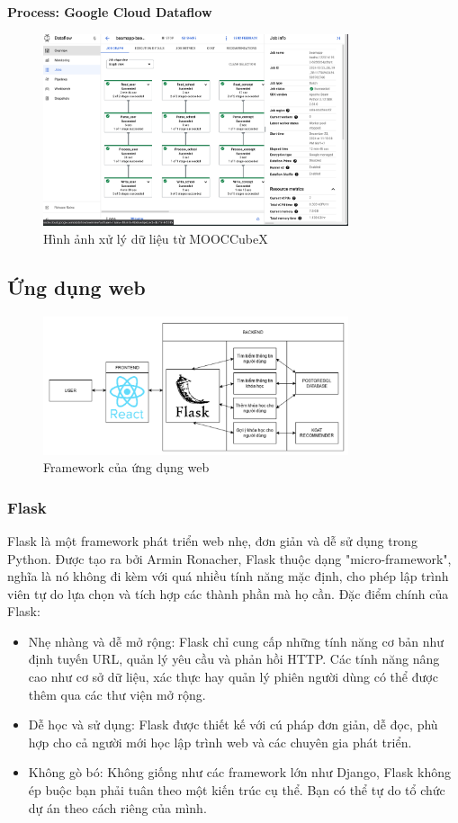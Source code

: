 \textbf{Process: Google Cloud Dataflow}
\begin{figure}[H]
    \centering
    \includegraphics[width=0.8\textwidth]{figures/74.png}
    \caption{Hình ảnh xử lý dữ liệu từ MOOCCubeX}
\end{figure}
\subsection{Ứng dụng web}
\begin{figure}[H]
    \centering
    \includegraphics[width=0.8\textwidth]{figures/79.png}
    \caption{Framework của ứng dụng web}
\end{figure}
\subsubsection{Flask}

Flask là một framework phát triển web nhẹ, đơn giản và dễ sử dụng trong Python.
Được tạo ra bởi Armin Ronacher, Flask thuộc dạng "micro-framework", nghĩa là nó
không đi kèm với quá nhiều tính năng mặc định, cho phép lập trình viên tự do lựa
chọn và tích hợp các thành phần mà họ cần. Đặc điểm chính của Flask:
\begin{itemize}
    \item Nhẹ nhàng và dễ mở rộng: Flask chỉ cung cấp những tính năng cơ bản như
        định tuyến URL, quản lý yêu cầu và phản hồi HTTP. Các tính năng nâng cao như cơ sở dữ liệu, xác thực hay quản lý phiên người dùng có thể được thêm qua các thư viện mở rộng.
    \item Dễ học và sử dụng: Flask được thiết kế với cú pháp đơn giản, dễ đọc,
        phù hợp cho cả người mới học lập trình web và các chuyên gia phát triển.
    \item Không gò bó: Không giống như các framework lớn như Django, Flask không
        ép buộc bạn phải tuân theo một kiến trúc cụ thể. Bạn có thể tự do tổ chức dự án theo cách riêng của mình.
\end{itemize}

